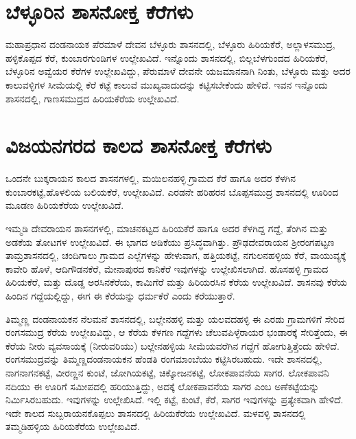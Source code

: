 \section{ಬೆಳ್ಳೂರಿನ ಶಾಸನೋಕ್ತ ಕೆರೆಗಳು}

ಮಹಾಪ್ರಧಾನ ದಂಡನಾಯಕ ಪೆರಮಾಳೆ ದೇವನ ಬೆಳ್ಳೂರು ಶಾಸನದಲ್ಲಿ, ಬೆಳ್ಳೂರು ಹಿರಿಯಕೆರೆ, ಅಲ್ಲಾಳಸಮುದ್ರ, ಹಳ್ಳಿಕೊಪ್ಪದ ಕೆರೆ, ಕುಂಬಾರಗುಂಡಿಗಳ ಉಲ್ಲೇಖವಿದೆ. ಇನ್ನೊಂದು ಶಾಸನದಲ್ಲಿ, ಬಿಲ್ಲಬೆಳಗುಂದದ ಹಿರಿಯಕೆರೆ, ಬೆಳ್ಳೂರಿನ ಅವ್ವೆಯರ ಕೆರೆಗಳ ಉಲ್ಲೇಖವಿದ್ದು, ಪೆರುಮಾಳೆ ದೇವನೇ ಯಜಮಾನನಾಗಿ ನಿಂತು, ಬೆಳ್ಳೂರು ಮತ್ತು ಅದರ ಕಾಲುವಳ್ಳಿಗಳ ಸೀಮೆಯಲ್ಲಿ ಕೆರೆ ಕಟ್ಟೆ ಕಾಲುವೆ ಮುಖ್ಯವಾದುದನ್ನು ಕಟ್ಟಿಸಬೇಕೆಂದು ಹೇಳಿದೆ. ಇವನ ಇನ್ನೊಂದು ಶಾಸನದಲ್ಲಿ, ಗಾಣಸಮುದ್ರದ ಹಿರಿಯಕೆರೆಯ ಉಲ್ಲೇಖವಿದೆ.


\section{ವಿಜಯನಗರದ ಕಾಲದ ಶಾಸನೋಕ್ತ ಕೆರೆಗಳು}

ಒಂದನೇ ಬುಕ್ಕರಾಯನ ಕಾಲದ ಶಾಸನಗಳಲ್ಲಿ, ಮಯಿಲನಹಳ್ಳಿ ಗ್ರಾಮದ ಕೆರೆ ಹಾಗೂ ಅದರ ಕೆಳಗಿನ ಕುಂಬಾರಕಟ್ಟೆ,ಹೊಳಲಿಯ ಬಲಿಯಕೆರೆ, ಉಲ್ಲೇಖವಿದೆ. ಎರಡನೇ ಹರಿಹರನ ಬೊಪ್ಪಸಮುದ್ರ ಶಾಸನದಲ್ಲಿ ಊರಿಂದ ಮೂಡಣ ಹಿರಿಯಕೆರೆಯ ಉಲ್ಲೇಖವಿದೆ.

ಇಮ್ಮಡಿ ದೇವರಾಯನ ಶಾಸನಗಳಲ್ಲಿ, ಮಾಚನಕಟ್ಟದ ಹಿರಿಯಕೆರೆ ಹಾಗೂ ಅದರ ಕೆಳಗಿದ್ದ ಗದ್ದೆ, ತೆಂಗಿನ ಮತ್ತು ಅಡಕೆಯ ತೋಟಗಳ ಉಲ್ಲೇಖವಿದೆ. ಈ ಭಾಗದ ಅಡಿಕೆಯು ಪ್ರಸಿದ್ಧವಾಗಿತ್ತು. ಪ್ರೌಢದೇವರಾಯನ ಶ‍್ರೀರಂಗಪಟ್ಟಣ ತಾಮ್ರಶಾಸನದಲ್ಲಿ, ಚಂದಿಗಾಲು ಗ್ರಾಮದ ಎಲ್ಲೆಗಳನ್ನು ಹೇಳುವಾಗ, ಹತ್ತಿಯಕಟ್ಟೆ, ನಗುಲನಹಳ್ಳಿಯ ಕೆರೆ, ವಾಯುವ್ಯಕ್ಕೆ ಕಾವೇರಿ ಹೊಳೆ, ಆದಿಗೌಡನಕೆರೆ, ಮೇನಾಪುರದ ಕಾನಿಕೆರೆ ಇವುಗಳನ್ನು ಉಲ್ಲೇಖಿಸಲಾಗಿದೆ. ಹೊಸಹಳ್ಳಿ ಗ್ರಾಮದ ಹಿರಿಯಕೆರೆ, ಮತ್ತು ದೊಡ್ಡ ಅರಸಿನಕೆರೆಯ, ಕಾಮಿಗೆರೆ ಮತ್ತು ಹಿರಿಯರಸಿನ ಕೆರೆಯ ಉಲ್ಲೇಖವಿದೆ. ಶಾಸನವು ಕೆರೆಯ ಹಿಂದಿನ ಗದ್ದೆಯಲ್ಲಿದ್ದು, ಈಗ ಈ ಕೆರೆಯನ್ನು ಧರ್ಮಕೆರೆ ಎಂದು ಕರೆಯುತ್ತಾರೆ.

ತಿಮ್ಮಣ್ಣ ದಂಡನಾಯಕನ ನೆಲಮನೆ ಶಾಸನದಲ್ಲಿ, ಬಲ್ಲೇನಹಳ್ಳಿ ಮತ್ತು ಯಲವದಹಳ್ಳಿ ಈ ಎರಡು ಗ್ರಾಮಗಳಿಗೆ ಸೇರಿದ ರಂಗಸಮುದ್ರ ಕೆರೆಯ ಉಲ್ಲೇಖವಿದ್ದು, ಆ ಕೆರೆಯ ಕೆಳಗಣ ಗದ್ದೆಗಳು ಚೆಲುವಪಿಳ್ಳೆರಾಯರ ಭಂಡಾರಕ್ಕೆ ಸೇರಿತ್ತೆಂದು, ಈ ಕೆರೆಯ ನೀರು ವ್ಯವಸಾಯಕ್ಕೆ (ನೀರುವರಿಯು) ಬಲ್ಲೇನಹಳ್ಳಿಯ ಸೀಮೆಯವರೆಗಿನ ಗದ್ದೆಗೆ ಹೋಗುತ್ತಿತ್ತೆಂದು ಹೇಳಿದೆ. ರಂಗಸಮುದ್ರವನ್ನು ತಿಮ್ಮಣ್ಣದಂಡನಾಯಕನ ಹೆಂಡತಿ ರಂಗಮಾಂಬೆಯು ಕಟ್ಟಿಸಿರಬಹುದು. ಇದೇ ಶಾಸನದಲ್ಲಿ, ನಾಗನಾಗನಕಟ್ಟೆ, ವೀರಣ್ಣನ ಕುಂಟೆ, ಜೋಗಿಯಕಟ್ಟೆ, ಚಿಕ್ಕೋಜನಕಟ್ಟೆ, ಲೋಕಪಾವನೆಯ ಸಾಗರ. ಲೋಕಪಾವನಿ ನದಿಯು ಈ ಊರಿಗೆ ಸಮೀಪದಲ್ಲಿ ಹರಿಯುತ್ತಿದ್ದು, ಅದಕ್ಕೆ ಲೋಕಪಾವನೆಯ ಸಾಗರ ಎಂಬ ಅಣೆಕಟ್ಟೆಯನ್ನು ನಿರ್ಮಿಸಿರಬಹುದು. ಇವುಗಳನ್ನು ಉಲ್ಲೇಖಿಸಿದೆ. ಇಲ್ಲಿ ಕಟ್ಟೆ, ಕುಂಟೆ, ಕೆರೆ, ಸಾಗರ ಇವುಗಳನ್ನು ಪ್ರತ್ಯೇಕವಾಗಿ ಹೇಳಿದೆ. ಇದೇ ಕಾಲದ ಸುಬ್ಬರಾಯನಕೊಪ್ಪಲು ಶಾಸನದಲ್ಲಿ ಹಿರಿಯಕೆರೆಯ ಉಲ್ಲೇಖವಿದೆ. ಮಳವಳ್ಳಿ ಶಾಸನದಲ್ಲಿ ತಮ್ಮಡಿಹಳ್ಳಿಯ ಹಿರಿಯಕೆರೆಯ ಉಲ್ಲೇಖವಿದೆ.

